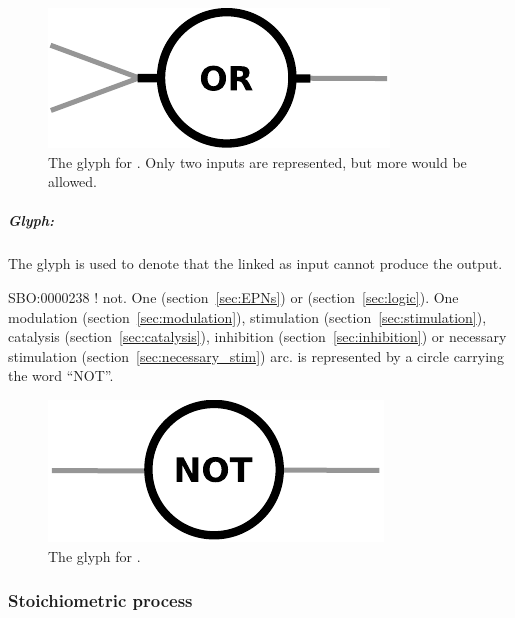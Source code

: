\begin{figure}[H]
  \centering
  \includegraphics[scale = 0.5]{images/or}
  \caption{The \PD glyph for . Only two inputs are represented, but more would be allowed.}
  \label{fig:or}
\end{figure}


\subparagraph{Glyph: }\label{sec:not}

The glyph  is used to denote that the  linked as input cannot produce the output.  

\begin{glyphDescription}
 \glyphSboTerm SBO:0000238 ! not.
 \glyphOrigin One  (section~\ref{sec:EPNs}) or  (section~\ref{sec:logic}).
 \glyphTarget  One modulation (section~\ref{sec:modulation}), stimulation (section~\ref{sec:stimulation}), catalysis (section~\ref{sec:catalysis}), inhibition (section~\ref{sec:inhibition}) or necessary stimulation (section~\ref{sec:necessary_stim}) arc.
 \glyphNode {} is represented by a circle carrying the word ``NOT''.
 \end{glyphDescription}

\begin{figure}[H]
  \centering
  \includegraphics[scale = 0.5]{images/not}
  \caption{The \PD glyph for .}
  \label{fig:not}
\end{figure}


\subsubsection{Stoichiometric process}

